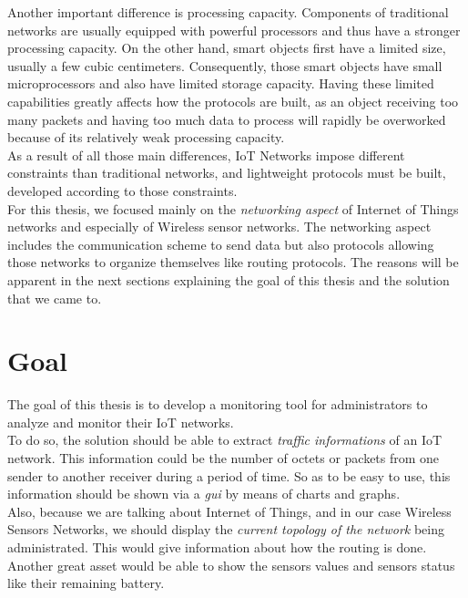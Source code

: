 Another important difference is processing capacity. Components of traditional networks are usually equipped with powerful processors and thus have a stronger processing capacity. On the other hand, smart objects first have a limited size, usually a few cubic centimeters. Consequently, those smart objects have small microprocessors and also have limited storage capacity. Having these limited capabilities greatly affects how the protocols are built, as an object receiving too many packets and having too much data to process will rapidly be overworked because of its relatively weak processing capacity. \\

As a result of all those main differences, IoT Networks impose different constraints than traditional networks, and lightweight protocols must be built, developed according to those constraints.\\

For this thesis, we focused mainly on the \textit{networking aspect} of Internet of Things networks and especially of Wireless sensor networks. The networking aspect includes the communication scheme to send data but also protocols allowing those networks to organize themselves like routing protocols. The reasons will be apparent in the next sections explaining the goal of this thesis and the solution that we came to.

\section*{Goal}

The goal of this thesis is to develop a monitoring tool for administrators to analyze and monitor their IoT networks.\\

To do so, the solution should be able to extract \textit{traffic informations} of an IoT network. This information could be the number of octets or packets from one sender to another receiver during a period of time. So as to be easy to use, this information should be shown via a \textit{\acrfull{gui}} by means of charts and graphs. \\

Also, because we are talking about Internet of Things, and in our case Wireless Sensors Networks, we should display the \textit{current topology of the network} being administrated. This would give information about how the routing is done. Another great asset would be able to show the sensors values and sensors status like their remaining battery.\\

